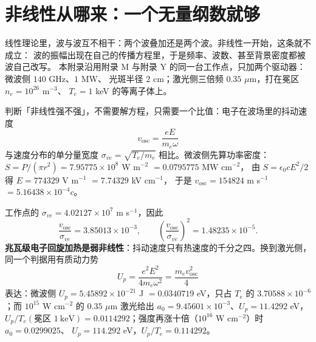 
\section{非线性从哪来：一个无量纲数就够}
\label{sec:app-al-nonlinear}

线性理论里，波与波互不相干：两个波叠加还是两个波。非线性一开始，这条就不成立：
波的振幅出现在自己的传播方程里，于是频率、波数、甚至背景密度都被波自己改写。
本附录沿用附录 M 与附录 Y 的同一台工作点，只加两个驱动器：微波侧 $140$ GHz、$1$ MW、
光斑半径 $2$ cm；激光侧三倍频 $0.35$ $\mu$m，打在冕区 $n_e = 10^{26}$ m$^{-3}$、
$T_e = 1$ keV 的等离子体上。

判断「非线性强不强」，不需要解方程，只需要一个比值：电子在波场里的抖动速度
\begin{equation}
v_{\mathrm{osc}} = \frac{eE}{m_e\omega}
\label{eq:app-al-vosc}
\end{equation}
与速度分布的单分量宽度 $\sigma_{ve}=\sqrt{T_e/m_e}$ 相比。微波侧先算功率密度：
$S = P/(\pi r^2) = 7.95775\times10^{8}$ W m$^{-2}$ $= 0.0795775$ MW cm$^{-2}$，
由 $S = \epsilon_0 c E^2/2$ 得 $E = 774329$ V m$^{-1}$ $= 7.74329$ kV cm$^{-1}$，
于是 $v_{\mathrm{osc}} = 154824$ m s$^{-1}$ $= 5.16438\times10^{-4}c$。

工作点的 $\sigma_{ve}=4.02127\times10^{7}$ m s$^{-1}$，因此
\begin{equation}
\frac{v_{\mathrm{osc}}}{\sigma_{ve}} = 3.85013\times10^{-3},
\qquad
\left(\frac{v_{\mathrm{osc}}}{\sigma_{ve}}\right)^{2} = 1.48235\times10^{-5}.
\label{eq:app-al-ratio}
\end{equation}
\textbf{兆瓦级电子回旋加热是弱非线性}：抖动速度只有热速度的千分之四。换到激光侧，
同一个判据用有质动力势
\begin{equation}
U_p = \frac{e^2E^2}{4m_e\omega^2} = \frac{m_ev_{\mathrm{osc}}^2}{4}
\label{eq:app-al-up}
\end{equation}
表达：微波侧 $U_p = 5.45892\times10^{-21}$ J $= 0.0340719$ eV，只占 $T_e$ 的
$3.70588\times10^{-6}$；而 $10^{15}$ W cm$^{-2}$ 的 $0.35$ $\mu$m 激光给出
$a_0 = 9.45601\times10^{-3}$、$U_p = 11.4292$ eV，$U_p/T_e(\text{冕区 }1\ \mathrm{keV})
= 0.0114292$；强度再涨十倍（$10^{16}$ W cm$^{-2}$）时 $a_0 = 0.0299025$、
$U_p = 114.292$ eV，$U_p/T_e = 0.114292$。


